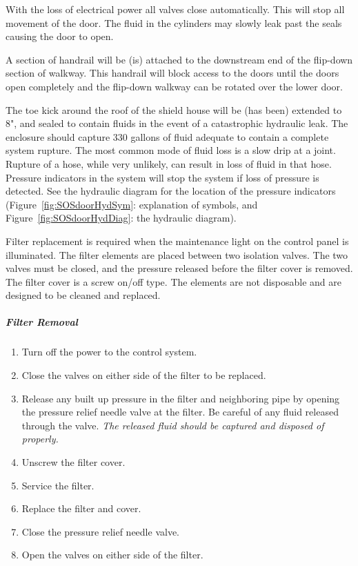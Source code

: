 \begin{obsolete}
With the loss of electrical power all valves close automatically. This will
stop all movement of the door. The fluid in the cylinders may slowly leak
past the seals causing the door to open.

A section of handrail will be (is) attached to the downstream end of the
flip-down section of walkway. This handrail will block access to the doors
until the doors open completely and the flip-down walkway can be rotated
over the lower door.

The toe kick around the roof of the shield house will be (has been)
extended to 8", and sealed to contain fluids in the event of a catastrophic
hydraulic leak. The enclosure should capture 330 gallons of fluid adequate
to contain a complete system rupture.  The most common mode of fluid
loss is a slow drip at a joint. Rupture of a hose, while very unlikely, can
result in loss of fluid in that hose. Pressure indicators in the system
will stop
the system if loss of pressure is detected. See the hydraulic diagram for
the location of the pressure indicators (Figure~\ref{fig:SOSdoorHydSym}: explanation of symbols,
and Figure~\ref{fig:SOSdoorHydDiag}: the hydraulic diagram).

Filter replacement is required when the maintenance light on the control
panel is illuminated. The filter elements are placed between two isolation
valves. The two valves must be closed, and the pressure released before
the filter cover is removed. The filter cover is a screw on/off type. The
elements are not disposable and are designed to be cleaned and replaced.

\subparagraph{Filter Removal}

\begin{enumerate}
\item{Turn off the power to the control system.}
\item{Close the valves on either side of the filter to be replaced.}
\item{Release any built up pressure in the filter and neighboring pipe by
opening the pressure relief needle valve at the filter. Be careful of any fluid
released through the valve. {\sl The released fluid should be captured and
disposed of properly.}}
\item{Unscrew the filter cover.}
\item{Service the filter.}
\item{Replace the filter and cover.}
\item{Close the pressure relief needle valve.}
\item{Open the valves on either side of the filter.}
\end{enumerate}


\end{obsolete}
